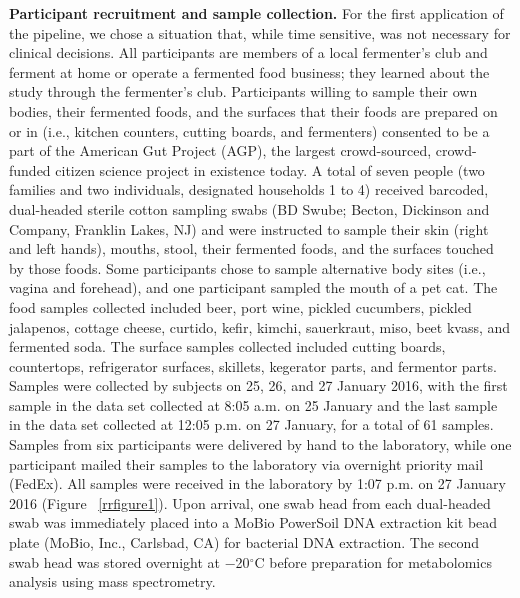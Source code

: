 \textbf{Participant recruitment and sample collection.} For the first application of
the pipeline, we chose a situation that, while time sensitive, was not necessary for
clinical decisions. All participants are members of a local fermenter’s club and ferment
at home or operate a fermented food business; they learned about the study through the
fermenter’s club. Participants willing to sample their own bodies, their fermented foods,
and the surfaces that their foods are prepared on or in (i.e., kitchen counters,
cutting boards, and fermenters) consented to be a part of the American Gut Project
(AGP), the largest crowd-sourced, crowd-funded citizen science project in existence
today. A total of seven people (two families and two individuals, designated households
1 to 4) received barcoded, dual-headed sterile cotton sampling swabs (BD Swube; Becton,
Dickinson and Company, Franklin Lakes, NJ) and were instructed to sample their skin
(right and left hands), mouths, stool, their fermented foods, and the surfaces
touched by those foods. Some participants chose to sample alternative body sites
(i.e., vagina and forehead), and one participant sampled the mouth of a pet cat.
The food samples collected included beer, port wine, pickled cucumbers, pickled
jalapenos, cottage cheese, curtido, kefir, kimchi, sauerkraut, miso, beet kvass,
and fermented soda. The surface samples collected included cutting boards,
countertops, refrigerator surfaces, skillets, kegerator parts, and fermentor parts.
Samples were collected by subjects on 25, 26, and 27 January 2016, with the first
sample in the data set collected at 8:05 a.m. on 25 January and the last sample
in the data set collected at 12:05 p.m. on 27 January, for a total of 61 samples.
Samples from six participants were delivered by hand to the laboratory, while one
participant mailed their samples to the laboratory via overnight priority mail
(FedEx). All samples were received in the laboratory by 1:07 p.m. on 27 January 2016
(Figure ~\ref{rrfigure1}). Upon arrival, one swab head from each dual-headed swab
was immediately placed into a MoBio PowerSoil DNA extraction kit bead plate
(MoBio, Inc., Carlsbad, CA) for bacterial DNA extraction. The second swab head was
stored overnight at −20$^{\circ}$C before preparation for metabolomics analysis using mass spectrometry.

